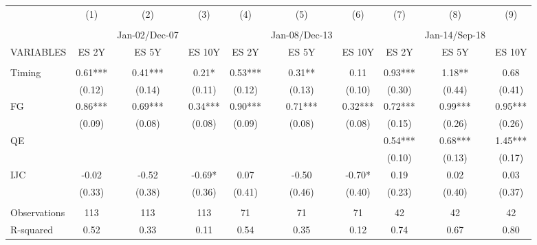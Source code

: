 \begin{tabular}{lccccccccc} \hline
 & (1) & (2) & (3) & (4) & (5) & (6) & (7) & (8) & (9) \\
 &  &  &  &  &  &  &  &  &  \\
 &  & Jan-02/Dec-07 &  &  & Jan-08/Dec-13 &  &  & Jan-14/Sep-18 &  \\
VARIABLES & ES 2Y & ES 5Y & ES 10Y & ES 2Y & ES 5Y & ES 10Y & ES 2Y & ES 5Y & ES 10Y \\ \hline
 &  &  &  &  &  &  &  &  &  \\
Timing & 0.61*** & 0.41*** & 0.21* & 0.53*** & 0.31** & 0.11 & 0.93*** & 1.18** & 0.68 \\
 & (0.12) & (0.14) & (0.11) & (0.12) & (0.13) & (0.10) & (0.30) & (0.44) & (0.41) \\
FG & 0.86*** & 0.69*** & 0.34*** & 0.90*** & 0.71*** & 0.32*** & 0.72*** & 0.99*** & 0.95*** \\
 & (0.09) & (0.08) & (0.08) & (0.09) & (0.08) & (0.08) & (0.15) & (0.26) & (0.26) \\
QE &  &  &  &  &  &  & 0.54*** & 0.68*** & 1.45*** \\
 &  &  &  &  &  &  & (0.10) & (0.13) & (0.17) \\
IJC & -0.02 & -0.52 & -0.69* & 0.07 & -0.50 & -0.70* & 0.19 & 0.02 & 0.03 \\
 & (0.33) & (0.38) & (0.36) & (0.41) & (0.46) & (0.40) & (0.23) & (0.40) & (0.37) \\
 &  &  &  &  &  &  &  &  &  \\
Observations & 113 & 113 & 113 & 71 & 71 & 71 & 42 & 42 & 42 \\
 R-squared & 0.52 & 0.33 & 0.11 & 0.54 & 0.35 & 0.12 & 0.74 & 0.67 & 0.80 \\ \hline
\end{tabular}
